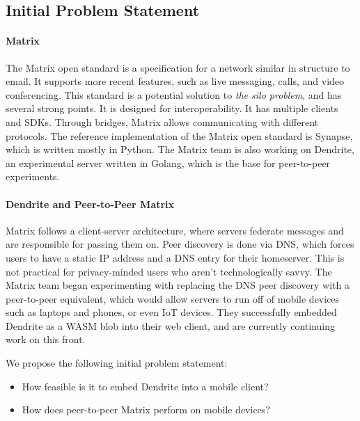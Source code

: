 \subsection{Initial Problem Statement}\label{subsec:initial_problem_statement}
\paragraph{Matrix}
The Matrix open standard\cite{matrix_org_spec} is a specification for a network similar in structure to email.
It supports more recent features, such as live messaging, calls, and video conferencing.
This standard is a potential solution to \textit{the silo problem}, and has several strong points.
It is designed for interoperability.
It has multiple clients\cite{matrix_org_clients} and SDKs\cite{matrix_org_sdks}.
Through bridges, Matrix allows communicating with different protocols\cite{matrix_org_bridges}.
The reference implementation of the Matrix open standard is Synapse\cite{matrix_org_synapse}, which is written mostly in Python.
The Matrix team is also working on Dendrite\cite{matrix_org_dendrite}, an experimental server written in Golang, which is the base for peer-to-peer experiments.

\paragraph{Dendrite and Peer-to-Peer Matrix}
Matrix follows a client-server architecture, where servers federate messages and are responsible for passing them on.
Peer discovery is done via DNS, which forces users to have a static IP address and a DNS entry for their homeserver.
This is not practical for privacy-minded users who aren't technologically savvy.
The Matrix team began experimenting with replacing the DNS peer discovery with a peer-to-peer equivalent, which would allow servers to run off of mobile devices such as laptops and phones, or even IoT devices.
They successfully embedded Dendrite as a WASM blob into their web client, and are currently continuing work on this front.

We propose the following initial problem statement:
\begin{itemize}
    \item How feasible is it to embed Dendrite into a mobile client?
    \item How does peer-to-peer Matrix perform on mobile devices?
\end{itemize}